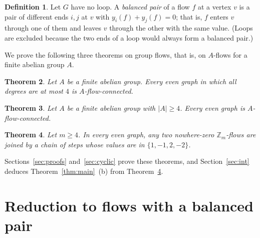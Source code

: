 \documentclass[11pt]{article}
\newtheorem{theorem}{Theorem}[section]
\theoremstyle{definition}
\newtheorem{definition}[theorem]{Definition}
\newcommand{\Z}{\mathbb{Z}}
\begin{document}
\begin{definition}\label{def:balanced}
Let $G$ have no loop. A \emph{balanced pair} of a flow $f$ at a vertex $v$ is a pair of different ends $i,j$ at
$v$ with $y_i(f)+y_j(f)=0$; that is, $f$ enters $v$ through one of them and leaves $v$ through the other with the same
value. (Loops are excluded because the two ends of a loop would always form a balanced pair.)
\end{definition}

We prove the following three theorems on group flows, that is, on $A$-flows for a finite abelian group $A$.
\begin{theorem}\label{thm:deg4}
Let $A$ be a finite abelian group. Every even graph in which all degrees are at most $4$ is $A$-flow-connected.
\end{theorem}

\begin{theorem}\label{thm:all}
Let $A$ be a finite abelian group with $|A|\ge 4$. Every even graph is $A$-flow-connected.
\end{theorem}

\begin{theorem}\label{thm:cyclic}
Let $m\ge 4$. In every even graph, any two nowhere-zero $\Z_m$-flows are joined by a chain of steps whose values are
in $\{1,-1,2,-2\}$.
\end{theorem}

Sections~\ref{sec:proofs} and~\ref{sec:cyclic} prove these theorems, and Section~\ref{sec:int} deduces Theorem~\ref{thm:main}~(b) from Theorem~\ref{thm:cyclic}.

\section{Reduction to flows with a balanced pair}\label{sec:red}
\end{document}
